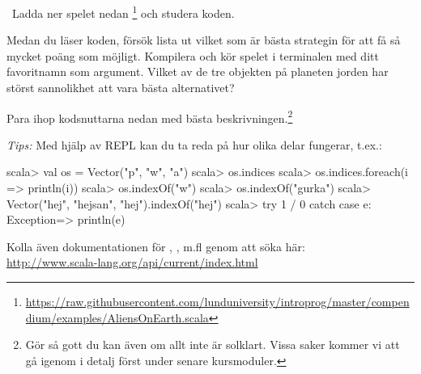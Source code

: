 \Task  \what~Ladda ner spelet nedan \footnote{
\url{https://raw.githubusercontent.com/lunduniversity/introprog/master/compendium/examples/AliensOnEarth.scala}} och studera koden.


%

\Subtask Medan du läser koden, försök lista ut vilket som är bästa strategin för att få så mycket poäng som möjligt. Kompilera och kör spelet i terminalen med ditt favoritnamn som argument. Vilket av de tre objekten på planeten jorden har störst sannolikhet att vara bästa alternativet?

\Subtask Para ihop kodsnuttarna nedan med bästa beskrivningen.\footnote{Gör så gott du kan även om allt inte är solklart. Vissa saker kommer vi att gå igenom i detalj först under senare kursmoduler.}

\begin{ConceptConnections}

\end{ConceptConnections}

\noindent\emph{Tips:} Med hjälp av REPL kan du ta reda på hur olika delar fungerar, t.ex.:

\begin{REPL}
scala> val os = Vector("p", "w", "a")
scala> os.indices
scala> os.indices.foreach(i => println(i))
scala> os.indexOf("w")
scala> os.indexOf("gurka")
scala> Vector("hej", "hejsan", "hej").indexOf("hej")
scala> try { 1 / 0 } catch { case e: Exception=> println(e) }
\end{REPL}
Kolla även dokumentationen för , , m.fl genom att söka
här: \\ \url{http://www.scala-lang.org/api/current/index.html}


